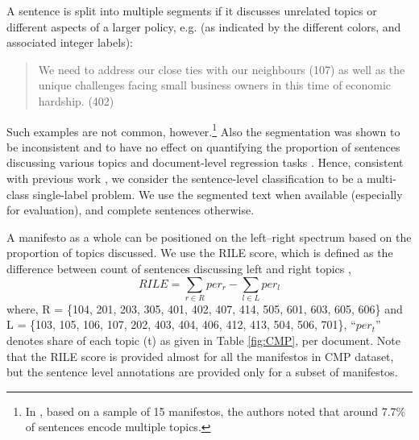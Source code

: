 \documentclass[11pt,a4paper]{article}
\begin{document}
A sentence is split into multiple segments if it discusses unrelated topics or different aspects of a larger policy, e.g. (as indicated by the different colors, and associated integer labels):
\begin{quote}
\color{red}
We need to address our close ties with our neighbours (107) \color{blue} as well as the unique challenges facing small business owners in this time of economic hardship. (402)
\end{quote}
Such examples are not common, however.\footnote{In , based on a sample of 15 manifestos, the authors noted that around 7.7\% of sentences encode multiple topics.} Also the segmentation was shown to be inconsistent and to have no effect on quantifying the proportion of sentences discussing various topics and document-level regression tasks \cite{daubler2012natural}. Hence, consistent with previous work \cite{biessmann2016automating, W17-2906}, we consider the sentence-level classification to be a multi-class single-label problem. We use the segmented text when available (especially for evaluation), and complete sentences otherwise.

A manifesto as a whole can be positioned on the left--right spectrum based on the proportion of topics discussed. We use the RILE score, which is defined as the difference between count of sentences discussing left and right topics \cite{cat}, 
\begin{equation}
RILE = \sum_{r \in R} per_{r} - \sum_{l \in L} per_{l}
\end{equation}
where, R = \{104, 201, 203, 305, 401, 402, 407, 414, 505, 601, 603, 605, 606\} and L = \{103, 105, 106, 107, 202, 403, 404, 406, 412, 413, 504, 506, 701\}, ``$per_{t}$'' denotes share of each topic (t) as given in Table \ref{fig:CMP}, per document.  Note that the RILE score is provided almost for all the manifestos in CMP dataset, but the sentence level annotations are provided only for a subset of manifestos. 
\end{document}
